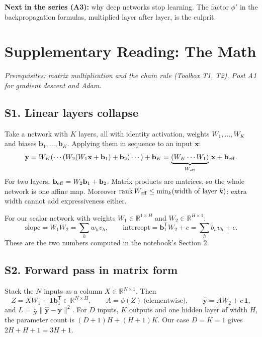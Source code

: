 \documentclass[11pt]{article}
\newcommand{\T}{\mathsf{T}}
\begin{document}
\textbf{Next in the series (A3):} why deep networks stop learning. The factor $\phi'$ in the backpropagation formulas, multiplied layer after layer, is the culprit.

\clearpage
\section*{Supplementary Reading: The Math}
\textit{Prerequisites: matrix multiplication and the chain rule (Toolbox T1, T2). Post A1 for gradient descent and Adam.}

\label{sec:S1}
\subsection*{S1. Linear layers collapse}
Take a network with $K$ layers, all with identity activation, weights $W_1,\dots,W_K$ and biases $\mathbf b_1,\dots,\mathbf b_K$. Applying them in sequence to an input $\mathbf x$:
\[
  \mathbf y=W_K(\cdots(W_2(W_1\mathbf x+\mathbf b_1)+\mathbf b_2)\cdots)+\mathbf b_K
  =\underbrace{(W_K\cdots W_1)}_{W_{\rm eff}}\,\mathbf x+\mathbf b_{\rm eff}.
\]
For two layers, $\mathbf b_{\rm eff}=W_2\mathbf b_1+\mathbf b_2$. Matrix products are matrices, so the whole network is one affine map. Moreover $\operatorname{rank}W_{\rm eff}\le\min_k(\text{width of layer }k)$: extra width cannot add expressiveness either.

For our scalar network with weights $W_1\in\mathbb R^{1\times H}$ and $W_2\in\mathbb R^{H\times1}$:
\[
  \text{slope}=W_1W_2=\sum_h w_hv_h,\qquad
  \text{intercept}=\mathbf b_1^{\T}W_2+c=\sum_h b_hv_h+c .
\]
These are the two numbers computed in the notebook's Section 2.

\subsection*{S2. Forward pass in matrix form}
Stack the $N$ inputs as a column $X\in\mathbb R^{N\times1}$. Then
\[
  Z=XW_1+\mathbf 1\mathbf b_1^{\T}\in\mathbb R^{N\times H},\qquad
  A=\phi(Z)\ \text{(elementwise)},\qquad
  \hat{\mathbf y}=AW_2+c\,\mathbf 1,
\]
and $L=\frac1N\lVert\hat{\mathbf y}-\mathbf y\rVert^2$. For $D$ inputs, $K$ outputs and one hidden layer of width $H$, the parameter count is $(D+1)H+(H+1)K$. Our case $D=K=1$ gives $2H+H+1=3H+1$.
\end{document}
